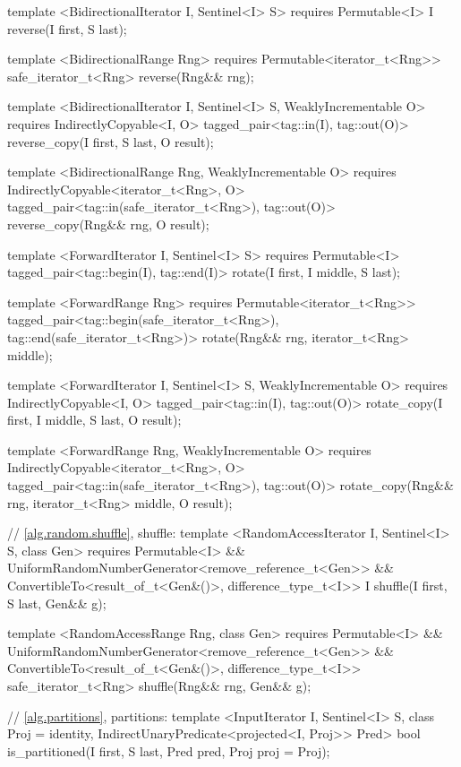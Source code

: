 \begin{codeblock}
{{{{  template <BidirectionalIterator I, Sentinel<I> S>
    requires Permutable<I>
    I reverse(I first, S last);

  template <BidirectionalRange Rng>
    requires Permutable<iterator_t<Rng>>
    safe_iterator_t<Rng>
      reverse(Rng&& rng);

  template <BidirectionalIterator I, Sentinel<I> S, WeaklyIncrementable O>
    requires IndirectlyCopyable<I, O>
    tagged_pair<tag::in(I), tag::out(O)> reverse_copy(I first, S last, O result);

  template <BidirectionalRange Rng, WeaklyIncrementable O>
    requires IndirectlyCopyable<iterator_t<Rng>, O>
    tagged_pair<tag::in(safe_iterator_t<Rng>), tag::out(O)>
      reverse_copy(Rng&& rng, O result);

  template <ForwardIterator I, Sentinel<I> S>
    requires Permutable<I>
    tagged_pair<tag::begin(I), tag::end(I)>
      rotate(I first, I middle, S last);

  template <ForwardRange Rng>
    requires Permutable<iterator_t<Rng>>
    tagged_pair<tag::begin(safe_iterator_t<Rng>),
                tag::end(safe_iterator_t<Rng>)>
      rotate(Rng&& rng, iterator_t<Rng> middle);

  template <ForwardIterator I, Sentinel<I> S, WeaklyIncrementable O>
    requires IndirectlyCopyable<I, O>
    tagged_pair<tag::in(I), tag::out(O)>
      rotate_copy(I first, I middle, S last, O result);

  template <ForwardRange Rng, WeaklyIncrementable O>
    requires IndirectlyCopyable<iterator_t<Rng>, O>
    tagged_pair<tag::in(safe_iterator_t<Rng>), tag::out(O)>
      rotate_copy(Rng&& rng, iterator_t<Rng> middle, O result);

  // \ref{alg.random.shuffle}, shuffle:
  template <RandomAccessIterator I, Sentinel<I> S, class Gen>
    requires Permutable<I> &&
      UniformRandomNumberGenerator<remove_reference_t<Gen>> &&
      ConvertibleTo<result_of_t<Gen&()>, difference_type_t<I>>
    I shuffle(I first, S last, Gen&& g);

  template <RandomAccessRange Rng, class Gen>
    requires Permutable<I> &&
      UniformRandomNumberGenerator<remove_reference_t<Gen>> &&
      ConvertibleTo<result_of_t<Gen&()>, difference_type_t<I>>
    safe_iterator_t<Rng>
      shuffle(Rng&& rng, Gen&& g);

  // \ref{alg.partitions}, partitions:
  template <InputIterator I, Sentinel<I> S, class Proj = identity,
      IndirectUnaryPredicate<projected<I, Proj>> Pred>
    bool is_partitioned(I first, S last, Pred pred, Proj proj = Proj{});

}}}}
\end{codeblock}
